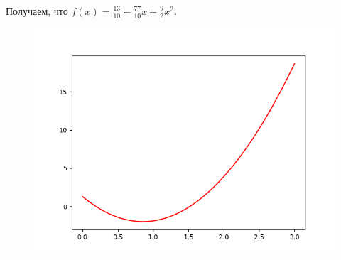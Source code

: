 \begin{example}
\begin{enumerate}[label=\textbf{{\alph*)}}, ref={\alph*}]
		Получаем, что $f(x) = \frac{13}{10} - \frac{77}{10} x + \frac{9}{2} x^2$.
		
		\begin{figure}[H]
			\centering
			\includegraphics[scale=0.65]{img/1b.png}
		\end{figure}
	\end{enumerate} 
\end{example}